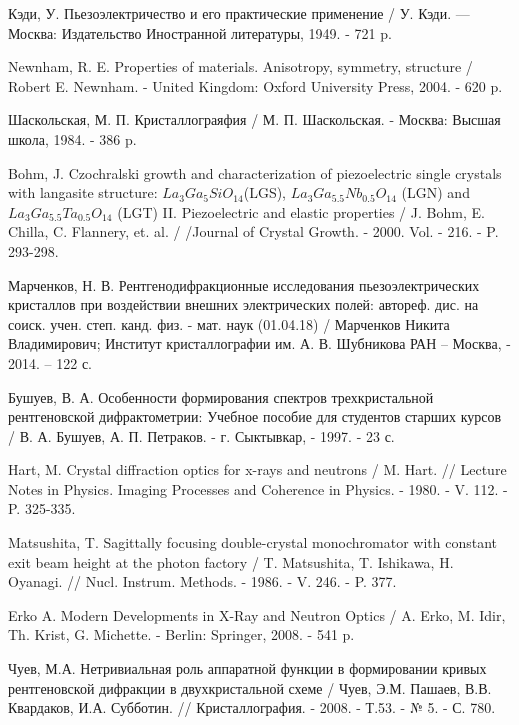 \begin{thebibliography}{99}
Кэди, У. Пьезоэлектричество и его практические применение / У. Кэди.
 — Москва: Издательство Иностранной литературы, 1949. - 721 p.

Newnham, R. E. Properties of materials. Anisotropy, symmetry, structure /
Robert E. Newnham.  - United Kingdom: Oxford University Press, 2004. -  620 p.

Шаскольская, М. П. Кристаллограяфия / М. П. Шаскольская. - Москва: Высшая школа, 1984. - 386 p.

 Bohm, J. Czochralski growth and characterization of piezoelectric single crystals
 with langasite structure: $La_{3}Ga_{5}SiO_{14}$(LGS), $La_{3}Ga_{5.5}Nb_{0.5}O_{14}$ (LGN) and
 $La_{3}Ga_{5.5}Ta_{0.5}O_{14}$ (LGT) II. Piezoelectric and elastic properties /
 J. Bohm, E. Chilla, C. Flannery, et. al. / /Journal of Crystal Growth. - 2000. Vol. - 216. - P. 293-298.

Марченков, Н. В. Рентгенодифракционные исследования пьезоэлектрических кристаллов
при воздействии внешних электрических полей: автореф. дис. на соиск.
учен. степ. канд. физ. - мат. наук (01.04.18) /
Марченков Никита Владимирович; Институт кристаллографии им. А. В. Шубникова РАН  – Москва, - 2014. – 122 с.

Бушуев, В. А. Особенности формирования спектров трехкристальной рентгеновской дифрактометрии:
Учебное пособие для студентов старших курсов  / В. А. Бушуев, А. П. Петраков. - г. Сыктывкар, - 1997. - 23 с.

Hart, M. Crystal diffraction optics for x-rays and neutrons /
M. Hart. // Lecture Notes in Physics. Imaging Processes and Coherence in Physics. - 1980. - V. 112. - P. 325-335.

Matsushita, T. Sagittally focusing double-crystal monochromator with constant
exit beam height at the photon factory / T. Matsushita, T. Ishikawa, H. Oyanagi.
// Nucl. Instrum. Methods. - 1986. - V. 246. - P. 377.

Erko A. Modern Developments in X-Ray and Neutron Optics / A. Erko, M. Idir, Th. Krist, G. Michette.
-   Berlin: Springer, 2008. - 541 p.

Чуев, М.А. Нетривиальная роль аппаратной функции в формировании
 кривых рентгеновской дифракции в двухкристальной схеме /
Чуев, Э.М. Пашаев, В.В. Квардаков, И.А. Субботин. // Кристаллография. -
 2008. - Т.53. - № 5. - С. 780.


\end{thebibliography}

